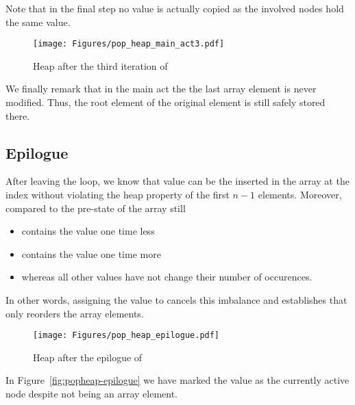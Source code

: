 \FloatBarrier
\clearpage

Note that in the final step no value is actually copied as the involved nodes
hold the same value.

\begin{figure}[hbt]
\centering
\texttt{[image: Figures/pop\_heap\_main\_act3.pdf]}
\caption{Heap after the third iteration of \popheap}
\end{figure}

\FloatBarrier

We finally remark that in the main act the the last array element is never modified.
Thus, the root element of the original element is still safely stored there.

\subsection{Epilogue}

After leaving the loop, we know that value  can be the inserted
in the array at the index  without violating the heap property of
the first $n-1$ elements.
%
Moreover, compared to the pre-state of \popheap the array  still
\begin{itemize}
\item contains the value  one time less
\item contains the value  one time more
\item whereas all other values have not change their number of occurences.
\end{itemize}

In other words, assigning the value  to 
cancels this imbalance and establishes that \popheap
only reorders the array elements.

\begin{figure}[hbt]
\centering
\texttt{[image: Figures/pop\_heap\_epilogue.pdf]}
\caption{Heap after the epilogue of \popheap}
\end{figure}

\FloatBarrier

In Figure~\ref{fig:popheap-epilogue} we have marked the value 
as the currently active node despite not being an array element.

\clearpage

